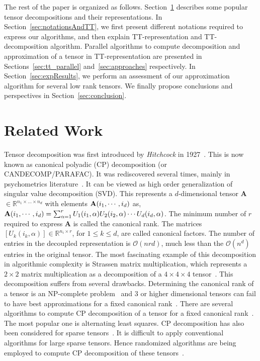 \documentclass[runningheads]{llncs}
\newcommand{\tensor}[1]{{\cal\textbf{#1}\xspace}}
\begin{document}
The rest of the paper is organized as follows. Section~\ref{sec:relatedWork} describes some popular tensor decompositions and their representations. In Section~\ref{sec:notationsAndTT}, we first present different notations required to express our algorithms, and then explain TT-representation and TT-decomposition algorithm. Parallel algorithms to compute decomposition and approximation of a tensor in TT-representation are presented in Sections~\ref{sec:tt_parallel} and~\ref{sec:approaches} respectively. In Section~\ref{sec:expResults}, we perform an assessment of our approximation algorithm for several low rank tensors. We finally propose conclusions and perspectives in Section~\ref{sec:conclusion}.

\section{Related Work}
\label{sec:relatedWork}
Tensor decomposition was first introduced by \emph{Hitchcock} in 1927~\cite{hitchcock-1927}. This is now known as canonical polyadic (CP) decomposition (or CANDECOMP/PARAFAC).
It was rediscovered several times, mainly in psychometrics literature~\cite{redisover-candlecom-1,redisover-candlecom-2}.
It can be viewed as high order generalization of singular value decomposition (SVD). This represents a $d$-dimensional tensor \tensor{A} $\in \mathbb{R}^{n_1 \times \ldots \times n_d}$ with elements $\tensor{A}(i_1,\cdots,i_d)$ as, $\tensor{A}(i_1,\cdots,i_d) = \sum_{\alpha=1}^{r} U_1(i_1,\alpha) U_2(i_2,\alpha)\cdots U_d(i_d,\alpha)$. The minimum number of $r$ required to express \tensor{A} is called the canonical rank. The matrices $[U_k(i_k,\alpha)] \in \mathbb{R}^{n_i \times r}$, for $1 \leq k \leq d$, are called canonical factors. The number of entries in the decoupled representation is $\mathcal{O}(nrd)$, much less than the $\mathcal{O}(n^d)$ entries in the original tensor.
The most fascinating example of this decomposition in algorithmic complexity is Strassen matrix multiplication, which represents a $2 \times 2$ matrix multiplication as a decomposition of a $4\times4\times4$ tensor~\cite{strassen-matrix-multiplication}. 
This decomposition suffers from several drawbacks. Determining the canonical rank of a tensor is an NP-complete problem~\cite{canonical-rank-npcomplete} and $3$ or higher dimensional tensors can fail to have best approximations for a fixed canonical rank~\cite{tensor-rank-best-low-rank-approximation}. There are several algorithms to compute CP decomposition of a tensor for a fixed canonical rank~\cite{redisover-candlecom-1,ma2020accelerating,singh2020comparison}. The most popular one is alternating least squares. CP decomposition has also been considered for sparse tensors~\cite{candecomp-sparse}. It is difficult to apply conventional algorithms for large sparse tensors. Hence randomized algorithms are being employed to compute CP decomposition of these tensors~\cite{larsen2020practical}.
\end{document}
